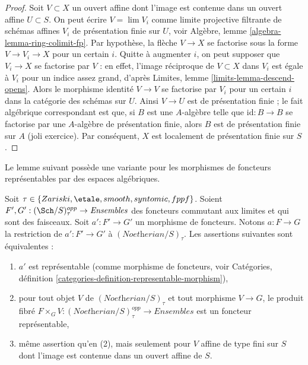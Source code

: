 \begin{proof}
Soit $V \subset X$ un ouvert affine dont l'image est contenue dans un
ouvert affine $U \subset S$. On peut écrire $V = \lim V_i$ comme limite projective filtrante de
schémas affines $V_i$ de présentation finie sur $U$, voir
Algèbre, lemme \ref{algebra-lemma-ring-colimit-fp}.
Par hypothèse, la flèche $V \to X$ se factorise sous la forme $V \to V_i \to X$
pour un certain $i$. Quitte à augmenter $i$, on peut supposer que $V_i \to X$
se factorise par $V$ : en effet, l'image réciproque de $V \subset X$ dans $V_i$
est égale à $V_i$ pour un indice assez grand, d'après
Limites, lemme \ref{limits-lemma-descend-opens}.
Alors le morphisme identité $V \to V$ se factorise par $V_i$ pour un certain $i$
dans la catégorie des schémas sur $U$. Ainsi $V \to U$ est de présentation finie ;
le fait algébrique correspondant est que, si $B$ est une $A$-algèbre
telle que $\text{id} : B \to B$ se factorise par une
$A$-algèbre de présentation finie, alors $B$ est de présentation finie sur $A$ (joli exercice).
Par conséquent, $X$ est localement de présentation finie sur $S$.
\end{proof}

\noindent
Le lemme suivant possède une variante pour les morphismes de foncteurs
représentables par des espaces algébriques.

\begin{lemma}
\label{lemma-representable}
Soit $\tau \in \{Zariski, \etale, smooth, syntomic, fppf\}$.
Soient $F', G' : (\Sch/S)_\tau^{opp} \to \textit{Ensembles}$ des foncteurs commutant aux limites
et qui sont des faisceaux. Soit $a' : F' \to G'$ un morphisme de foncteurs.
Notons $a : F \to G$ la restriction de $a' : F' \to G'$ à
$(\textit{Noetherian}/S)_\tau$. Les assertions suivantes sont équivalentes :
\begin{enumerate}
\item $a'$ est représentable (comme morphisme de foncteurs, voir
Catégories, définition \ref{categories-definition-representable-morphism}),
\item pour tout objet $V$ de $(\textit{Noetherian}/S)_\tau$
et tout morphisme $V \to G$, le produit fibré
$F \times_G V : (\textit{Noetherian}/S)_\tau^{opp} \to \textit{Ensembles}$
est un foncteur représentable,
\item même assertion qu'en (2), mais seulement pour $V$ affine de type fini sur $S$
dont l'image est contenue dans un ouvert affine de $S$.
\end{enumerate}
\end{lemma}


